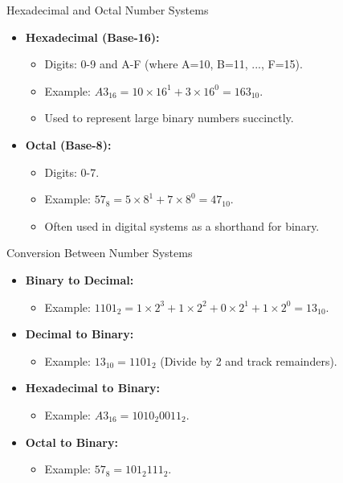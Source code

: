 \documentclass[aspectratio=169]{beamer}
\begin{document}
\begin{frame}{Hexadecimal and Octal Number Systems}
    \begin{itemize}
        \item \textbf{Hexadecimal (Base-16):} 
        \begin{itemize}
            \item Digits: 0-9 and A-F (where A=10, B=11, ..., F=15).
            \item Example: \( A3_{16} = 10 \times 16^1 + 3 \times 16^0 = 163_{10} \).
            \item Used to represent large binary numbers succinctly.
        \end{itemize}
        \item \textbf{Octal (Base-8):} 
        \begin{itemize}
            \item Digits: 0-7.
            \item Example: \( 57_8 = 5 \times 8^1 + 7 \times 8^0 = 47_{10} \).
            \item Often used in digital systems as a shorthand for binary.
        \end{itemize}
    \end{itemize}
\end{frame}

\begin{frame}{Conversion Between Number Systems}
    \begin{itemize}
        \item \textbf{Binary to Decimal:} 
        \begin{itemize}
            \item Example: \( 1101_2 = 1 \times 2^3 + 1 \times 2^2 + 0 \times 2^1 + 1 \times 2^0 = 13_{10} \).
        \end{itemize}
        \item \textbf{Decimal to Binary:} 
        \begin{itemize}
            \item Example: \( 13_{10} = 1101_2 \) (Divide by 2 and track remainders).
        \end{itemize}
        \item \textbf{Hexadecimal to Binary:} 
        \begin{itemize}
            \item Example: \( A3_{16} = 1010_2 0011_2 \).
        \end{itemize}
        \item \textbf{Octal to Binary:} 
        \begin{itemize}
            \item Example: \( 57_8 = 101_2 111_2 \).
        \end{itemize}
    \end{itemize}
\end{frame}
\end{document}

